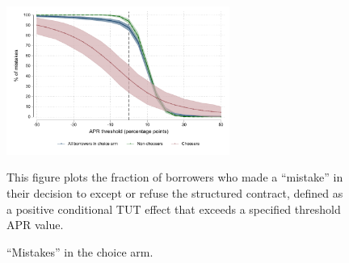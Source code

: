 \documentclass[12pt, a4paper, colorinlistoftodos]{article}
\begin{document}
\vspace{.2in}
\begin{figure}[H]
 \caption{``Mistakes'' in the choice arm.}
\begin{center}
        \centering
        \includegraphics[width=0.65\textwidth]{Figuras/line_cw_apr_tot_tut.pdf}
 \end{center}       
 \scriptsize{
 This figure plots the fraction of borrowers who made a ``mistake'' in their decision to except or refuse the structured contract, defined as a positive conditional TUT effect that exceeds a specified threshold APR value.
 
}
    \label{choose_wrong}
\end{figure}
\end{document}
